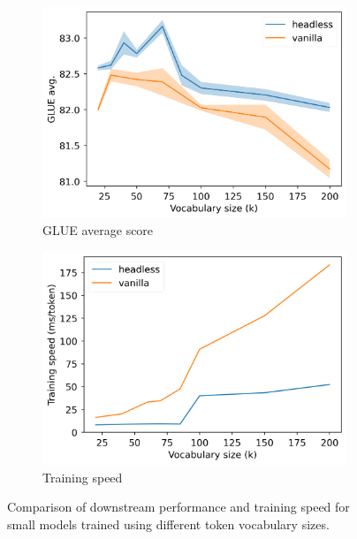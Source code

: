 \begin{figure}[h]
    \centering
    \begin{subfigure}[b]{0.40\columnwidth}
         \includegraphics[width=\linewidth]{sources/part_2/headless/imgs/bert_vocabsize_p13.png}
         \caption{GLUE average score}
         \label{fig:glue_tokencount}
    \end{subfigure}
    \begin{subfigure}[b]{0.40\columnwidth}
         \includegraphics[width=\linewidth]{sources/part_2/headless/imgs/speed_vocabsize_p13.png}
         \caption{Training speed}
         \label{fig:throughput_tokencount}
    \end{subfigure}
    \caption{Comparison of downstream performance and training speed for small models trained using different token vocabulary sizes.}
    \label{fig:tokencount}
\end{figure}

